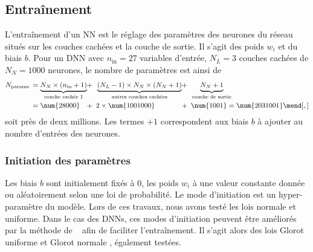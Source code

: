 \subsection{Entraînement}\label{chapter-ML-section-DNN-training}
L'entraînement d'un NN est le réglage des paramètres des neurones du réseau situés sur les couches cachées et la couche de sortie.
Il s'agit des poids $w_i$ et du biais $b$.
Pour un DNN avec
$n_\text{in} = \num{27}$ variables d'entrée,
$N_L = \num{3}$ couches cachées
de $N_N = \num{1000}$ neurones,
le nombre de paramètres est ainsi de
\begin{align}
N_\text{params.}
&= \underbrace{N_N \times (n_\text{in} + 1)}_\text{couche cachée 1} \!\!\!&\!\!\!+\,\,\,& \underbrace{(N_L -1)\times N_N \times(N_N+1)}_\text{autres couches cachées} \!\!\!&\!\!\!+\,\,\,& \underbrace{N_N +1\vphantom{()}}_\text{couche de sortie}
\nonumber\\&
=
\num{28000} \!\!\!&\!\!\!+\,\,\,& 2\times\num{1001000} \!\!\!&\!\!\!+\,\,\,& \num{1001}
=
\num{2031001}
\mend[,]
\end{align}
soit près de deux millions.
Les termes \og $+1$ \fg{} correspondent aux biais $b$ à ajouter au nombre d'entrées des neurones.
\subsubsection{Initiation des paramètres}
Les biais $b$ sont initialement fixés à 0,
les poids $w_i$ à une valeur constante donnée ou aléatoirement selon une loi de probabilité.
Le mode d'initiation est un hyper-paramètre du modèle.
Lors de ces travaux, nous avons testé les lois normale et uniforme.
Dans le cas des DNNs, ces modes d'initiation peuvent être améliorés par la méthode de \citeauthor{glorot}~\cite{glorot} afin de faciliter l'entraînement.
Il s'agit alors des lois \og Glorot uniforme \fg{} et \og Glorot normale \fg, également testées.
